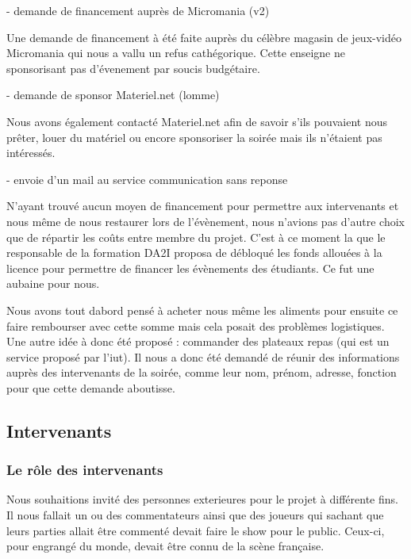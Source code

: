 - demande de financement auprès de Micromania (v2)

Une demande de financement à été faite auprès du célèbre magasin de
jeux-vidéo Micromania qui nous a vallu un refus cathégorique. Cette
enseigne ne sponsorisant pas d'évenement par soucis
budgétaire.

- demande de sponsor Materiel.net (lomme)

Nous avons également contacté Materiel.net afin de savoir s'ils pouvaient nous prêter,
louer du matériel ou encore sponsoriser la soirée mais ils n'étaient pas intéressés.

- envoie d'un mail au service communication sans reponse

N'ayant trouvé aucun moyen de financement pour permettre aux
intervenants et nous même de nous restaurer lors de l'évènement, nous
n'avions pas d'autre choix que de répartir les coûts entre membre du
projet. C'est à ce moment la que le responsable de la formation DA2I
proposa de débloqué les fonds allouées à la licence pour permettre de
financer les évènements des étudiants. Ce fut une aubaine pour nous.

Nous avons tout dabord pensé à acheter nous même les aliments pour
ensuite ce faire rembourser avec cette somme mais cela posait des
problèmes logistiques. Une autre idée à donc été proposé : commander des
plateaux repas (qui est un service proposé par l'iut). Il nous a donc
été demandé de réunir des informations auprès des intervenants de la
soirée, comme leur nom, prénom, adresse, fonction pour que cette demande
aboutisse.

\subsection{Intervenants}%
\label{sub:intervenants}

\subsubsection{Le rôle des intervenants}%
\label{ssub:le_role_des_intervenants}

Nous souhaitions invité des personnes exterieures pour le projet à
différente fins. Il nous fallait un ou des commentateurs ainsi que des
joueurs qui sachant que leurs parties allait être commenté devait faire
le show pour le public. Ceux-ci, pour engrangé du monde, devait être
connu de la scène française.

